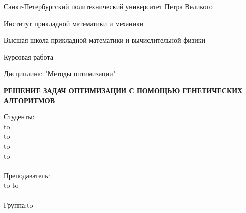 


\thispagestyle{empty}

\begin{center}

\fontsize{14pt}{Министерство науки и высшего образования Российской Федерации}

Санкт-Петербургский политехнический университет Петра Великого
\vspace{0.4cm}

Институт прикладной математики и механики

Высшая школа прикладной математики и вычислительной физики
\vspace{5cm}

Курсовая работа

Дисциплина: "Методы оптимизации"

\vspace{1.4cm}

\large{\textbf{РЕШЕНИЕ ЗАДАЧ ОПТИМИЗАЦИИ С ПОМОЩЬЮ ГЕНЕТИЧЕСКИХ АЛГОРИТМОВ}}
\end{center}

\vspace{3cm}

\newbox{\lbox}
\newlength{\maxl}
\setlength{\maxl}{\wd\lbox}

\hfill\parbox{8cm}{
Студенты:\\
\hspace*{0cm} \hfill\hbox to \\
\hspace*{0cm}\hfill\hbox to\\
\hspace*{0cm}\hfill\hbox to\\
\hspace*{0cm}\hfill\hbox to\\
\\
Преподаватель:\\
\hspace*{0cm}\hfill\hbox to
\hspace*{0cm}\hfill\hbox to
\\
\\
\hspace*{5cm}\hspace*{-5cm}Группа:\hfill\hbox to\\
}

